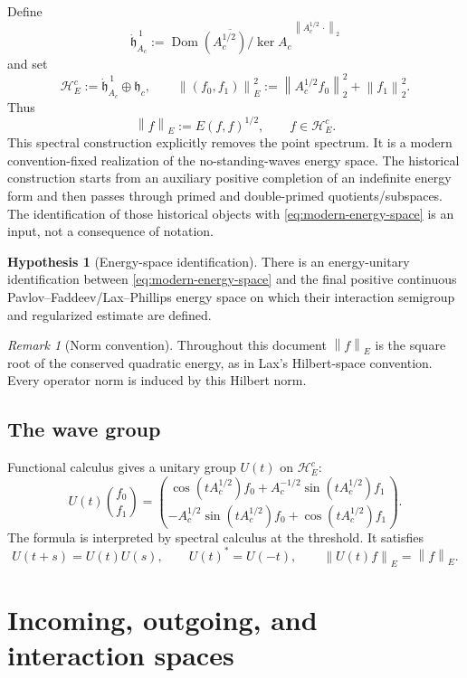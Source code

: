 \documentclass[11pt]{amsart}
\theoremstyle{definition}
\newtheorem{hypothesis}[theorem]{Hypothesis}
\theoremstyle{remark}
\newtheorem{remark}[theorem]{Remark}
\DeclareMathOperator{\Dom}{Dom}
\newcommand{\Hcal}{\mathcal H}
\newcommand{\norm}[1]{\left\lVert #1\right\rVert}
\begin{document}
Define
\[
 \dot{\mathfrak h}^{\,1}_{A_c}
 :=
 \overline{\Dom(A_c^{1/2})/\ker A_c}^{\,
            \norm{A_c^{1/2}\,\cdot}_{2}}
\]
and set
\begin{equation}\label{eq:modern-energy-space}
 \Hcal_{E}^{c}
 :=\dot{\mathfrak h}^{\,1}_{A_c}\oplus\mathfrak h_c,
 \qquad
 \norm{(f_{0},f_{1})}_{E}^{2}
 :=\norm{A_{c}^{1/2}f_{0}}_{2}^{2}+\norm{f_{1}}_{2}^{2}.
\end{equation}
Thus
\[
 \norm{f}_{E}:=E(f,f)^{1/2},
 \qquad f\in\Hcal_{E}^{c}.
\]
This spectral construction explicitly removes the point spectrum.  It is a
modern convention-fixed realization of the no-standing-waves energy space.
The historical construction starts from an auxiliary positive completion of
an indefinite energy form and then passes through primed and double-primed
quotients/subspaces.  The identification of those historical objects with
\eqref{eq:modern-energy-space} is an input, not a consequence of notation.

\begin{hypothesis}[Energy-space identification]\label{hyp:energy}
There is an energy-unitary identification between
\eqref{eq:modern-energy-space} and the final positive continuous
Pavlov--Faddeev/Lax--Phillips energy space on which their interaction semigroup
and regularized estimate are defined.
\end{hypothesis}

\begin{remark}[Norm convention]
Throughout this document $\norm{f}_{E}$ is the square root of the conserved
quadratic energy, as in Lax's Hilbert-space convention.  Every operator norm is
induced by this Hilbert norm.
\end{remark}

\subsection{The wave group}

Functional calculus gives a unitary group $U(t)$ on $\Hcal_{E}^{c}$:
\[
 U(t)\binom{f_{0}}{f_{1}}
 =\binom{
   \cos(tA_{c}^{1/2})f_{0}
   +A_{c}^{-1/2}\sin(tA_{c}^{1/2})f_{1}}
 {-A_{c}^{1/2}\sin(tA_{c}^{1/2})f_{0}
   +\cos(tA_{c}^{1/2})f_{1}}.
\]
The formula is interpreted by spectral calculus at the threshold.  It satisfies
\[
 U(t+s)=U(t)U(s),\qquad U(t)^{*}=U(-t),\qquad
 \norm{U(t)f}_{E}=\norm{f}_{E}.
\]

\section{Incoming, outgoing, and interaction spaces}\label{sec:interaction}
\end{document}
